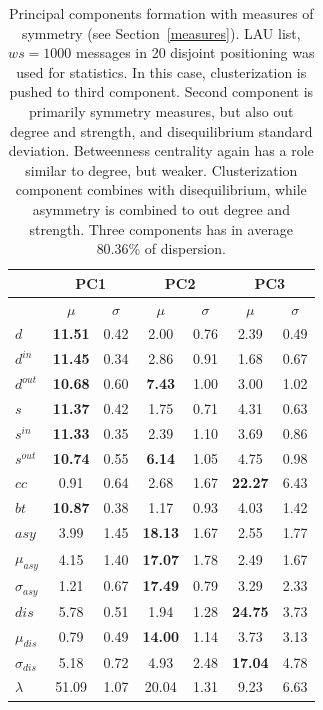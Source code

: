 \documentclass[%
 aip,
 jmp,%
 amsmath,amssymb,
 reprint,%
]{revtex4-1}
\begin{document}
\begin{table}
  \centering
  \caption{Principal components formation with measures of symmetry (see Section~\ref{measures}). LAU list, $ws=1000$ messages in 20 disjoint positioning was used for statistics. In this case, clusterization is pushed to third component. Second component is primarily symmetry measures, but also out degree and strength, and disequilibrium standard deviation. Betweenness centrality again has a role similar to degree, but weaker. Clusterization component combines with disequilibrium, while asymmetry is combined to out degree and strength. Three components has in average 80.36\% of dispersion.}
  \begin{tabular}{|l|c|c| c|c| c|c|}\hline
 & \multicolumn{2}{c|}{PC1} & \multicolumn{2}{c|}{PC2} & \multicolumn{2}{c|}{PC3}  \\\hline
       & $\mu$ & $\sigma$ & $\mu$ & $\sigma$ & $\mu$ & $\sigma$  \\\hline
$d$            & {\bf 11.51} & 0.42 & 2.00  & 0.76 & 2.39  & 0.49 \\ 
$d^{in}$       & {\bf 11.45} & 0.34 & 2.86  & 0.91 & 1.68  & 0.67 \\
$d^{out}$      & {\bf 10.68} & 0.60 & {\bf 7.43}  & 1.00 & 3.00  & 1.02 \\
$s$            & {\bf 11.37} & 0.42 & 1.75  & 0.71 & 4.31  & 0.63 \\ 
$s^{in}$       & {\bf 11.33} & 0.35 & 2.39  & 1.10 & 3.69  & 0.86 \\ 
$s^{out}$      & {\bf 10.74} & 0.55 & {\bf 6.14}  & 1.05 & 4.75  & 0.98 \\ \hline
$cc$           & 0.91        & 0.64 & 2.68  & 1.67 & {\bf 22.27} & 6.43 \\ 
$bt$           & {\bf 10.87} & 0.38 & 1.17  & 0.93 & 4.03  & 1.42 \\ \hline
$asy$          & 3.99        & 1.45 & {\bf 18.13} & 1.67 & 2.55  & 1.77 \\
$\mu_{asy}$    & 4.15        & 1.40 & {\bf 17.07} & 1.78 & 2.49  & 1.67 \\
$\sigma_{asy}$ & 1.21        & 0.67 & {\bf 17.49} & 0.79 & 3.29  & 2.33 \\
$dis$          & 5.78        & 0.51 & 1.94  & 1.28 & {\bf 24.75} & 3.73 \\
$\mu_{dis}$    & 0.79        & 0.49 & {\bf 14.00} & 1.14 & 3.73  & 3.13 \\
$\sigma_{dis}$ & 5.18        & 0.72 & 4.93  & 2.48 & {\bf 17.04} & 4.78 \\ \hline
$\lambda$      & 51.09       & 1.07 & 20.04 & 1.31 & 9.23  & 6.63 \\ \hline
  \end{tabular}
  \label{compPCA2}
\end{table}
\end{document}
